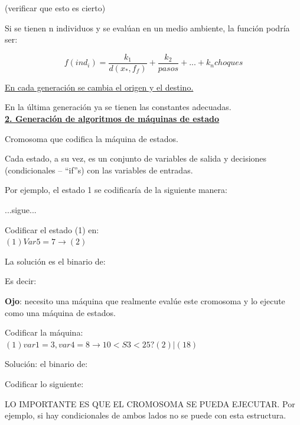 (verificar que esto es cierto)

Si se tienen n individuos y se evalúan en un medio ambiente, la función podría ser:

$$ f(ind_i) = \dfrac{k_1}{d(x_*,f_f)} + \dfrac{k_2}{pasos} + ... + k_n choques $$

\underline{En cada generación se cambia el origen y el destino.}

En la última generación ya se tienen las constantes adecuadas. \\


\textbf{\underline{2. Generación de algoritmos de máquinas de estado}}

Cromosoma que codifica la máquina de estados.


Cada estado, a su vez, es un conjunto de variables de salida y decisiones (condicionales – “if”s) con las
variables de entradas.


Por ejemplo, el estado 1 se codificaría de la siguiente manera:


...sigue...


\begin{ejemplo}
Codificar el estado (1) en: \\
$(1) Var5 = 7 \rightarrow (2)$
\end{ejemplo}

La solución es el binario de:

Es decir: 


\textbf{Ojo}: necesito una máquina que realmente evalúe este cromosoma y lo ejecute como una máquina de estados.

\begin{ejemplo}
	Codificar la máquina: \\
	$ (1) var1 = 3, var4 = 8 \rightarrow 10 < S3 < 25 ? (2) | (18)$
\end{ejemplo}

Solución: el binario de:


\begin{ejemplo}
Codificar lo siguiente:
\end{ejemplo}


\begin{nota}
LO IMPORTANTE ES QUE EL CROMOSOMA SE PUEDA EJECUTAR. Por ejemplo, si hay
condicionales de ambos lados no se puede con esta estructura.
\end{nota}

